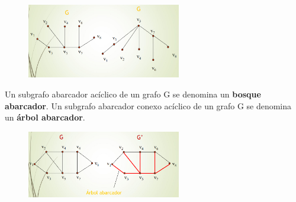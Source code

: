 \begin{figure}[h]
\centering
\includegraphics[width = 0.6\textwidth]{figs/arbol-bosque.png}
\end{figure}

Un subgrafo abarcador acíclico de un grafo G se denomina un \textbf{bosque abarcador}. Un subgrafo abarcador conexo acíclico de un grafo G se denomina un \textbf{árbol abarcador}.

\begin{figure}[h]
\centering
\includegraphics[width = 0.6\textwidth]{figs/arbol-abarcador.png}
\end{figure}


